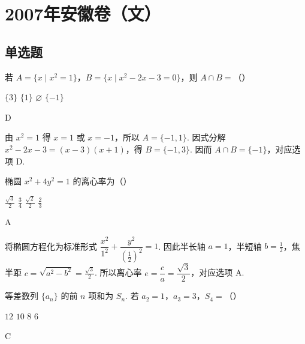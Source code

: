 \chapter{2007年安徽卷（文）}

\section{单选题}

\begin{problem}
若 \(A = \{x \mid x^2 = 1\}\)，\(B = \{x \mid x^2 - 2x - 3 = 0\}\)，则 \(A \cap B =\)（\quad）

\choices
    {\(\{3\}\)}
    {\( \{1\} \)}
    {\(\varnothing\)}
    {\(\{-1\}\)}
\end{problem}

\begin{answer}
D
\end{answer}

\begin{solution}
由 \(x^{2}=1\) 得 \(x=1\) 或 \(x=-1\)，所以 \(A=\{-1,1\}\). 因式分解
\(x^{2}-2x-3=(x-3)(x+1)\)，得 \(B=\{-1,3\}\). 因而
\(A\cap B=\{-1\}\)，对应选项 D.
\end{solution}

\begin{problem}
椭圆 \(x^{2} + 4y^{2} = 1\) 的离心率为（\quad）

\choices
    {\(\frac{\sqrt{3}}{2}\)}
    {\(\frac{3}{4}\)}
    {\(\frac{\sqrt{2}}{2}\)}
    {\(\frac{2}{3}\)}
\end{problem}

\begin{answer}
A
\end{answer}

\begin{solution}
将椭圆方程化为标准形式
\(\dfrac{x^{2}}{1^{2}}+\dfrac{y^{2}}{\left(\frac12\right)^{2}}=1\). 因此半长轴
\(a=1\)，半短轴 \(b=\frac12\)，焦半距
\(c=\sqrt{a^{2}-b^{2}}=\frac{\sqrt3}{2}\). 所以离心率
\(e=\dfrac ca=\dfrac{\sqrt3}{2}\)，对应选项 A.
\end{solution}

\begin{problem}
等差数列 \(\{a_{n}\}\) 的前 \(n\) 项和为 \(S_{n}\). 若 \(a_{2} = 1\)，\(a_{3} = 3\)，\(S_{4} =\)（\quad）

\choices
    {\(12\)}
    {\(10\)}
    {\(8\)}
    {\(6\)}
\end{problem}

\begin{answer}
C
\end{answer}

